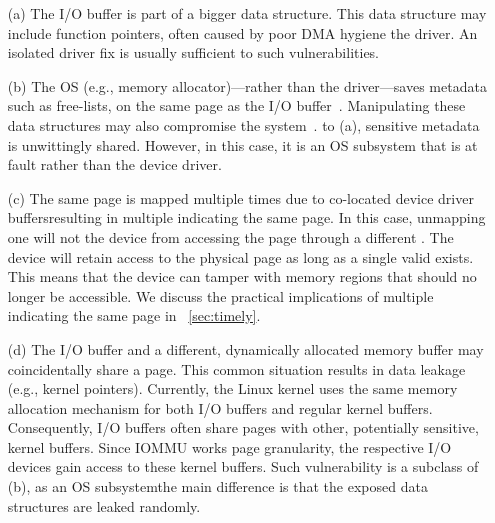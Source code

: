 \begin{enumerate}
    \item[(a)] The I/O buffer is part of a bigger data structure. This data structure may include function pointers, often caused by poor DMA hygiene \DIFdelbegin {}\DIFdelend \DIFaddbegin {}\DIFaddend the driver. An isolated driver fix is usually sufficient to \DIFdelbegin {}\DIFdelend \DIFaddbegin {}\DIFaddend such vulnerabilities.
    \item[(b)] The OS (e.g., memory allocator)---rather than the driver---saves metadata \DIFdelbegin \DIFdel{, }\DIFdelend such as free-lists, on the same page as the I/O buffer~\cite{Cor07}. Manipulating these data structures may also compromise the system~\cite{ak09}. \DIFdelbegin {}\DIFdelend \DIFaddbegin {}\DIFaddend to (a), sensitive metadata is unwittingly shared. However, in this case, it is an OS subsystem that is at fault rather than the device driver.
    \item[(c)] The same page is mapped multiple times due to co-located device driver buffers\DIFaddbegin \DIFadd{, }\DIFaddend resulting in multiple \iova{}\DIFaddbegin {}\DIFaddend indicating the same page. 
    In this case, unmapping one \iova will not \DIFdelbegin {}\DIFdelend \DIFaddbegin {}\DIFaddend the device from accessing the page through a different \iova.
    The device will retain access to the physical page as long as a single valid \iova{} exists. This means that the device can tamper with memory regions that should no longer be accessible\DIFdelbegin {}\DIFdelend . We discuss the practical implications of multiple \iova indicating the same page in \DIFdelbegin {}\DIFdelend \DIFaddbegin {}\DIFaddend ~\ref{sec:timely}.
    \item[(d)] The I/O buffer and a different, dynamically allocated memory buffer may coincidentally share a page. This common situation results in data leakage (e.g., kernel pointers). Currently, the Linux kernel uses the same \DIFaddbegin {}\DIFaddend memory allocation mechanism \DIFdelbegin {}\DIFdelend for both I/O buffers and regular kernel buffers. Consequently, I/O buffers often share pages with other, potentially sensitive, kernel buffers. Since IOMMU works \DIFdelbegin {}\DIFdelend \DIFaddbegin {}\DIFaddend page granularity, the respective I/O devices gain access to these kernel buffers. Such vulnerability is a subclass of (b), as \DIFaddbegin {}\DIFaddend an OS subsystem\DIFdelbegin {}\DIFdelend \DIFaddbegin \DIFadd{; }\DIFaddend the main difference is that the exposed data structures are leaked randomly.
\end{enumerate}

